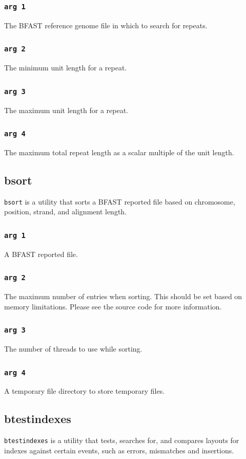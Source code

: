 \documentclass[a4paper,12pt]{book}
\newcommand{\TT}[1]{{\tt #1}} %
\newcommand{\BRGF}{BFAST reference genome file} %
\newcommand{\BRF}{BFAST reported file} %
\begin{document}
\subsubsection{\TT{arg 1}}
The \BRGF{} in which to search for repeats.
\subsubsection{\TT{arg 2}}
The minimum unit length for a repeat.
\subsubsection{\TT{arg 3}}
The maximum unit length for a repeat.
\subsubsection{\TT{arg 4}}
The maximum total repeat length as a scalar multiple of the unit length.
\subsection{bsort}
\label{sec:bsort}
\TT{bsort} is a utility that sorts a \BRF{} based on chromosome, position, strand, and alignment length.
\subsubsection{\TT{arg 1}}
A \BRF{}.
\subsubsection{\TT{arg 2}}
The maximum number of entries when sorting.
This should be set based on memory limitations.
Please see the source code for more information.
\subsubsection{\TT{arg 3}}
The number of threads to use while sorting.
\subsubsection{\TT{arg 4}}
A temporary file directory to store temporary files.
\subsection{btestindexes}
\label{sec:btestindexes}
\TT{btestindexes} is a utility that tests, searches for, and compares layouts for indexes against certain events, such as errors, mismatches and insertions.
\end{document}
